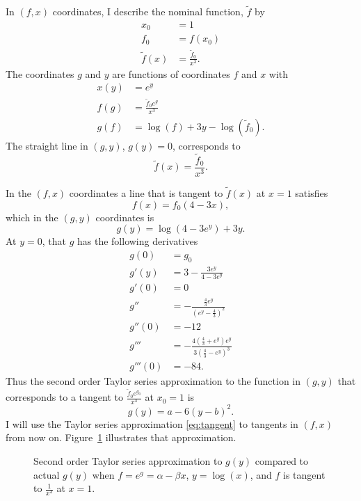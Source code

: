 \documentclass[]{article}
\begin{document}
In $(f,x)$ coordinates, I describe the nominal function, $\tilde f$ by
\begin{align*}
  x_0 &= 1\\
  f_0 &= f(x_0) \\
  \tilde f(x) &= \frac{\tilde f_0}{x^3}.
\end{align*}
The coordinates $g$ and $y$ are functions of coordinates $f$ and $x$ with
\begin{align*}
  x(y) &= e^y \\
  f(g) &= \frac{\tilde f_0 e^{g}}{x^3} \\
  g(f) &= \log(f) + 3y - \log(\tilde f_0).
\end{align*}
The straight line in $(g,y)$, $g(y) = 0$, corresponds to
\begin{equation*}
  \tilde f(x) = \frac{\tilde f_0}{x^3}.
\end{equation*}

In the $(f,x)$ coordinates a line that is tangent to $\tilde f(x)$ at
$x=1$ satisfies
\begin{equation*}
  f(x) = f_0(4-3x),
\end{equation*}
which in the $(g,y)$ coordinates is
\begin{equation*}
  g(y) = \log \left( 4 - 3e^y \right) + 3y.
\end{equation*}
At $y=0$, that $g$ has the following derivatives
\begin{align*}
  g(0) & = g_0 \\
  g'(y) &= 3 - \frac{3e^y}{4-3e^y} \\
  g'(0) &= 0 \\
  g'' &= -\frac{\frac{4}{3}e^y}{\left( e^y - \frac{4}{3} \right)^2}\\
  g''(0) &= -12 \\
  g''' &= -\frac{4\left( \frac{4}{3} + e^y \right) e^y}{
    3\left( \frac{4}{3} - e^y \right) ^3} \\
  g'''(0) &= -84.
\end{align*}
Thus the second order Taylor series approximation to the function in
$(g,y)$ that corresponds to a tangent to $\frac{\tilde f_0
  e^{g_0}}{x^3}$ at $x_0 = 1$ is
\begin{equation}
  \label{eq:tangent}
  g(y) = a - 6(y-b)^2.
\end{equation}
I will use the Taylor series approximation \eqref{eq:tangent} to
tangents in $(f,x)$ from now on.  Figure~\ref{fig:taylor} illustrates
that approximation.

\begin{figure}
  \centering
  \caption{Second order Taylor series approximation to $g(y)$ compared
    to actual $g(y)$ when $f = e^g = \alpha - \beta x$,
    $y=\log(x)$, and $f$ is tangent to $\frac{1}{x^3}$ at $x=1$.}
  \label{fig:taylor}
\end{figure}
\end{document}
